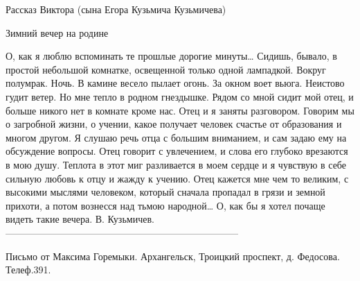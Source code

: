 Рассказ Виктора (сына Егора Кузьмича Кузьмичева)

Зимний вечер на родине

О, как я люблю вспоминать те прошлые дорогие минуты…
Сидишь, бывало, в простой небольшой комнатке, освещенной только одной лампадкой. Вокруг полумрак. Ночь. В камине весело пылает огонь. За окном воет вьюга. Неистово гудит ветер. Но мне тепло в родном гнездышке. Рядом со мной сидит мой отец, и больше никого нет в комнате  кроме нас. Отец и я заняты разговором. Говорим мы о загробной жизни, о учении, какое получает человек счастье от образования и многом другом. Я слушаю речь отца с большим вниманием, и сам задаю ему на обсуждение вопросы. Отец говорит с увлечением, и слова его глубоко врезаются в мою душу. Теплота в этот миг разливается в моем сердце и я чувствую в себе сильную любовь к отцу и жажду к учению. Отец кажется мне чем то великим, с высокими мыслями человеком, который сначала пропадал в грязи и земной прихоти, а потом вознесся над тьмою народной…
О, как бы я хотел почаще видеть такие вечера. 
В. Кузьмичев.
------------------------------------------------------------------------


\date{1912-02-27}

Письмо от Максима Горемыки.
Архангельск,
Троицкий проспект, д. Федосова.
Телеф.391.

